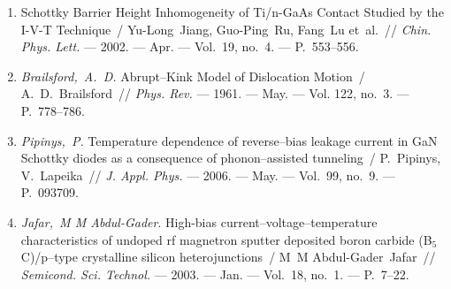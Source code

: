 \begin{enumerate}[label=\arabic*$^*$.,leftmargin=0em,itemindent=3em]
\item
Schottky Barrier Height Inhomogeneity of Ti/n-GaAs Contact Studied by the I-V-T
  Technique~/ Yu-Long~Jiang, Guo-Ping~Ru, Fang~Lu et~al.~// \emph{Chin.
  Phys. Lett.} ---
  2002. --- Apr. ---
  Vol.~19, no.~4. ---
  P.~553--556.

\item
\emph{Brailsford,~A.~D.} Abrupt--Kink Model of Dislocation Motion~/
  A.~D.~Brailsford~// \emph{Phys. Rev.} ---
  1961. --- May. ---
  Vol. 122, no.~3. ---
  P.~778--786.

\item
\emph{Pipinys,~P.} Temperature dependence of reverse--bias leakage current
  in {G}a{N} {S}chottky diodes as a consequence of phonon--assisted tunneling~/
  P.~Pipinys, V.~Lapeika~// \emph{J. Appl. Phys.} ---
  2006. --- May. ---
  Vol.~99, no.~9. ---
  P.~093709.

\item
\emph{Jafar,~M M Abdul-Gader}. High-bias current--voltage--temperature
  characteristics of undoped rf magnetron sputter deposited boron carbide
  ({B}$_5${C})/p--type crystalline silicon heterojunctions~/ M~M
  Abdul-Gader~Jafar~// \emph{Semicond. Sci. Technol.} ---
  2003. --- Jan. ---
  Vol.~18, no.~1. ---
  P.~7--22.
\end{enumerate}
